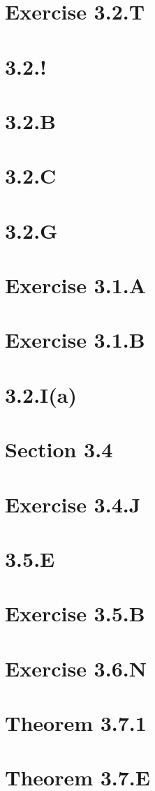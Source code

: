 \documentclass{book}
\theoremstyle{definition}
\begin{document}
\section{Exercise 3.2.T}
\section{3.2.!}
\section{3.2.B}
\section{3.2.C}
\section{3.2.G}
\section{Exercise 3.1.A} 
\section{Exercise 3.1.B}
\section{3.2.I(a)} 
\section{Section 3.4} 
\section{Exercise 3.4.J} 
\section{3.5.E} 
\section{Exercise 3.5.B} 
\section{Exercise 3.6.N}
\section{Theorem 3.7.1} 
\section{Theorem 3.7.E} 
\end{document}
